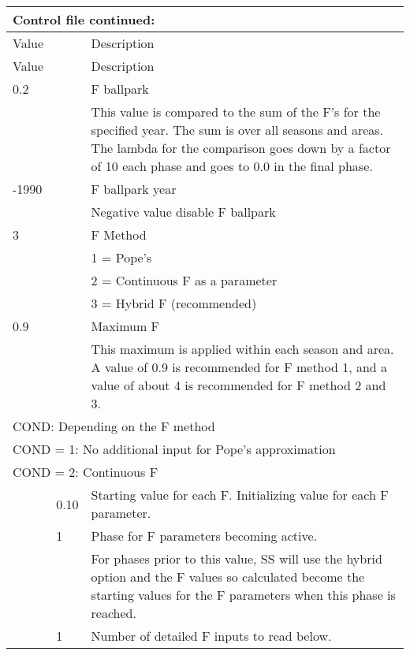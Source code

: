 \begin{center}
		\begin{longtable}{p{1cm} p{3cm} p{11cm}}
			\multicolumn{3}{l}{Control file continued:}\\
			\hline
			Value &   &  Description\\
			\hline
			\endfirsthead

			\hline
			Value &  &  Description\\
			\hline
			\endhead

			\endfoot
			\endlastfoot

			0.2 & & F ballpark\\
			    & & This value is compared to the sum of the F’s for the specified year.  The sum is over all seasons and areas.  The lambda for the comparison goes down by a factor of 10 each phase and goes to 0.0 in the final phase.\\
		   \hline
			-1990 & & F ballpark year \\
			      & & Negative value disable F ballpark \\
		   \hline
			 3  & & F Method \\
			    & & 1 = Pope's \\
			    & & 2 = Continuous F as a parameter \\
			    & & 3 = Hybrid F (recommended)\\
		   \hline
		   0.9 & & Maximum F \\
		       & & This maximum is applied within each season and area.   A value of 0.9 is recommended for F method 1, and a value of about 4 is recommended for F method 2 and 3. \\
		   \hline
		   \multicolumn{3}{l}{COND: Depending on the F method} \\
		   \hline
		   \multicolumn{3}{l}{COND = 1: No additional input for Pope's approximation}\\
		   \hline
		   \multicolumn{3}{l}{COND = 2: Continuous F}\\
		   & 0.10 & Starting value for each F.  Initializing value for each F parameter.\\
		   & 1 & Phase for F parameters becoming active.  \\
		   &   & For phases prior to this value,  SS will use the hybrid option and the F values so calculated become the starting values for the F parameters when this phase is reached.\\
		   & 1 & Number of detailed F inputs to read below. \\
		   \hline

\end{longtable}
\end{center}
